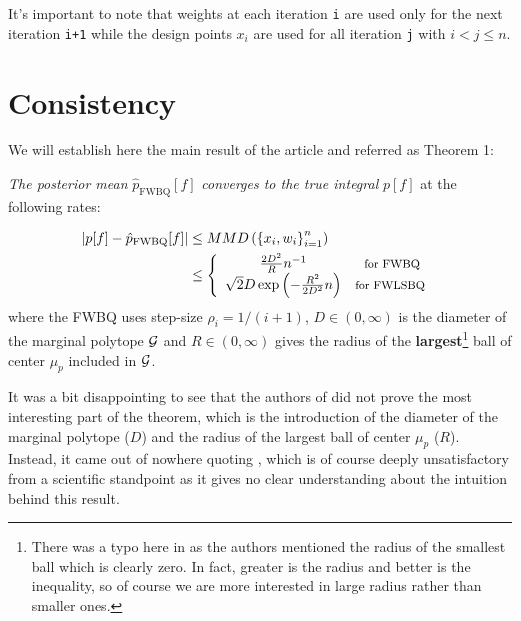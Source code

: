  It's important to note that weights at each iteration \texttt{i} are used only for
 the next iteration \texttt{i+1} while the design points $x_i$ are used for all iteration \texttt{j} with $i<j\leq n$.

\section{Consistency}
\label{sec:consistency}

We will establish here the main result of the article \cite{FWBQ} and referred as Theorem 1:
\begin{boxdefinition}
  \begin{center}
    \textit{The posterior mean }$\hat { p } _ { \mathrm { FWBQ } } [ f ]$ \textit{converges
    to the true integral }$p[f]$ at the following rates:
  \end{center}
\begin{align}
    \left| p [ f ] - \hat { p } _ { \mathrm { FWBQ } } [ f ] \right| &\leq M M D \left( \left\{ x _ { i } , w _ { i } \right\} _ { i = 1 } ^ { n } \right) \nonumber\\
    &\leq \left\{ \begin{array} { c c } { \frac { 2 D ^ { 2 } } { R } n ^ { - 1 } } & { \footnotesize \text {for  FWBQ} } \\ { \sqrt { 2 } D \exp \left( - \frac { R ^ { 2 } } { 2 D ^ { 2 } } n \right) } & {\footnotesize \text {for FWLSBQ } } \end{array} \right.
\end{align}
where the FWBQ uses step-size $\rho _ { i } = 1 / ( i + 1 )$, $D \in ( 0 , \infty )$
  is the diameter of the marginal polytope $\mathcal{G}$ and $R \in ( 0 , \infty )$ gives the
  radius of the \textbf{largest}\footnote{There was a typo here in \cite{FWBQ} as the authors mentioned the radius  of the smallest ball which is clearly zero. In fact, greater is the radius and better is the inequality, so of course we are more interested in large
  radius rather than smaller ones. } ball of center $\mu_p$ included in $\mathcal{G}$.
\end{boxdefinition}

It was a bit disappointing to see that the authors of \cite{FWBQ} did not prove the most interesting part of the theorem,
 which is the introduction of the diameter of the marginal polytope ($D$) and the radius of the largest ball of center $\mu_p$ ($R$). Instead, it came out of nowhere quoting \cite{Bach}, which is of course deeply unsatisfactory from a scientific standpoint
  as it gives no clear understanding about the intuition behind this result.

